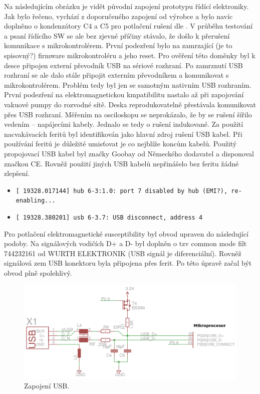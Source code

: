 Na následujícím obrázku je vidět původní zapojení prototypu řídící elektroniky. Jak bylo řečeno, vychází z doporučeného zapojení od výrobce a bylo navíc doplněno o kondenzátory C4 a C5 pro potlačení rušení dle \cite{intel}. V průběhu testování a psaní řídícího SW se ale bez zjevné příčiny stávalo, že došlo k přerušení komunikace s mikrokontrolérem. První podezření bylo na zamrzající (je to spisovný?) firmware mikrokontroléru a jeho reset. Pro ověření této doměnky byl k desce připojen externí převodník USB na sériové rozhraní. Po zamrznutí USB rozhraní se ale dalo stále připojit externím převodníkem a komunikovat s mikrokontrolérem. Problém tedy byl jen se samotným nativním USB rozhraním. 
První podezření na elektromagnetickou kmpatibilitu nastalo až při zapojování vakuové pumpy do rozvodné sítě. Deska reprodukovatelně přestávala komunikovat přes USB rozhraní. Měřením na osciloskopu se neprokázalo, že by se rušení šířilo vedením – napájecími kabely. 
Jednalo se tedy o rušení indukované. Za použití nacvakávacích feritů byl identifikován jako hlavní zdroj rušení USB kabel. Při používání feritů je důležité umisťovat je co nejblíže koncům kabelů.
Použitý propojovací USB kabel byl značky Goobay od Německého dodavatel a disponoval značkou CE. Rovněž použití jiných USB kabelů nepřinášelo bez feritu žádné zlepšení. 

\begin{itemize}
\item \verb|[ 19328.017144] hub 6-3:1.0: port 7 disabled by hub (EMI?), re-enabling...|
\item \verb|[ 19328.380201] usb 6-3.7: USB disconnect, address 4|
\end{itemize}





Pro potlačení elektromagnetické susceptibility byl obvod upraven do následující podoby.
Na signálových vodičích D+ a D- byl doplněn o tzv common mode filt 744232161 od WURTH ELEKTRONIK (USB signál je diferenciální). Rovněž signálová zem USB konektoru byla připojena přes ferit. Po této úpravě začal být obvod plně spolehlivý.

\begin{figure}[h!]

  \centering
    \includegraphics[width=0.8\linewidth]{obrazky/usbEMI.png}%
    \caption{Zapojení USB.}
\end{figure}

